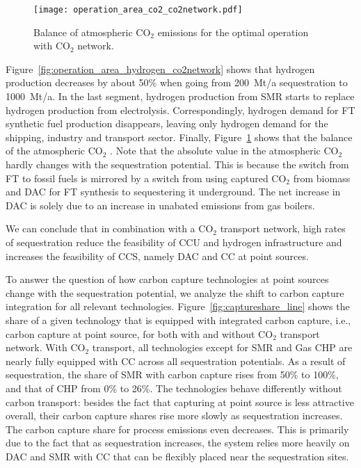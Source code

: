 \documentclass[conference]{IEEEtran}
\newcommand{\carbon}{CO$_2$ }
\begin{document}
%
\begin{figure}
    \centering
    \texttt{[image: operation\_area\_co2\_co2network.pdf]}
    \caption{Balance of atmospheric \carbon emissions for the optimal operation with \carbon network.}
    \label{fig:operation_area_co2_co2network}
\end{figure}
%
Figure~\ref{fig:operation_area_hydrogen_co2network} shows that hydrogen production decreases by about 50\% when going from 200~Mt/a sequestration to 1000~Mt/a. In the last segment, hydrogen production from SMR starts to replace hydrogen production from electrolysis. Correspondingly, hydrogen demand for FT synthetic fuel production disappears, leaving only hydrogen demand for the shipping, industry and transport sector. Finally, Figure~\ref{fig:operation_area_co2_co2network} shows that the balance of the atmospheric \carbon. Note that the absolute value in the atmospheric \carbon hardly changes with the sequestration potential. This is because the switch from FT to fossil fuels is mirrored by a switch from using captured \carbon from biomass and DAC for FT synthesis to sequestering it underground. The net increase in DAC is solely due to an increase in unabated emissions from gas boilers.


We can conclude that in combination with a \carbon transport network, high rates of sequestration reduce the feasibility of CCU and hydrogen infrastructure and increases the feasibility of CCS, namely DAC and CC at point sources.

To answer the question of how carbon capture technologies at point sources change with the sequestration potential, we analyze the shift to carbon capture integration for all relevant technologies.
Figure~\ref{fig:captureshare_line} shows the share of a given technology that is equipped with integrated carbon capture, i.e., carbon capture at point source, for both with and without \carbon transport network.
With \carbon transport, all technologies except for SMR and Gas CHP are nearly fully equipped with CC across all sequestration potentials. As a result of sequestration, the share of SMR with carbon capture rises from 50\% to 100\%, and that of CHP from 0\% to 26\%. The technologies behave differently without carbon transport: besides the fact that capturing at point source is less attractive overall, their carbon capture shares rise more slowly as sequestration increases. The carbon capture share for process emissions even decreases. This is primarily due to the fact that as sequestration increases, the system relies more heavily on DAC and SMR with CC that can be flexibly placed near the sequestration sites.
\end{document}
